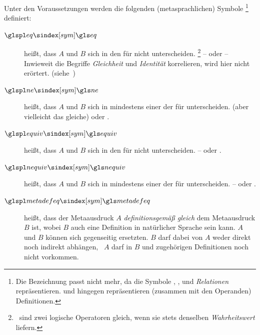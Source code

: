 Unter den Voraussetzungen  werden die folgenden (metasprachlichen) Symbole%
\footnote{%
	Die Bezeichnung  passt nicht mehr, da die Symbole \symqt{$\eq$}, \symqt{$\neq$}, \symqt{$\equiv$} und \symqt{$\nequiv$} \emph{Relationen} repräsentieren. \sym{$\metadefeq$} und  hingegen repräsentieren (zusammen mit den Operanden) Definitionen.
}
definiert:
\begin{description}
	\item[$\glsSym{eq}$~~\emph{}]\label{def:Gleichheit}
	 heißt, dass $A$ und $B$ sich in den  für \symqt{$=$} nicht unterscheiden.%
	\footnote{%
		\textZB\ sind zwei logische Operatoren gleich, wenn sie stets denselben \emph{\gls{Wahrheitswert}} liefern.
	}
	--  oder 
	-- Inwieweit die Begriffe \emph{Gleichheit} und \emph{Identität} korrelieren, wird hier nicht erörtert. (siehe~\cite{bib:Identitaet})
	\item[$\glsSym{ne}$~~\emph{}]\label{def:Ungleichheit}
	 heißt, dass $A$ und $B$ sich in mindestens einer der  für \symqt{$=$} unterscheiden.  (aber vielleicht das gleiche) oder .
	\item[$\glsSym{equiv}$~~\emph{}]\label{def:Äquivalenz}
	 heißt, dass $A$ und $B$ sich in den  für \symqt{$\equiv$} nicht unterscheiden.
	--  oder .
	\item[$\glsSym{nequiv}$~~\emph{}]\label{def:Kontravalenz}
	 heißt, dass $A$ und $B$ sich in mindestens einer der  für \symqt{$\nequiv$} unterscheiden.
	--  oder .
	\item[$\glsSym{metadefeq}$~\emph{}]\label{def:Metadefinition}
	 heißt, dass der Metaausdruck $A$ \emph{definitionsgemäß gleich} dem Metaausdruck $B$ ist, wobei $B$ auch eine Definition in natürlicher Sprache sein kann.
	$A$ und $B$ können sich gegenseitig ersetzten.
	$B$ darf dabei von $A$ weder direkt noch indirekt abhängen, \textdh\ $A$ darf in $B$ und zugehörigen Definitionen noch nicht vorkommen.


\end{description}
